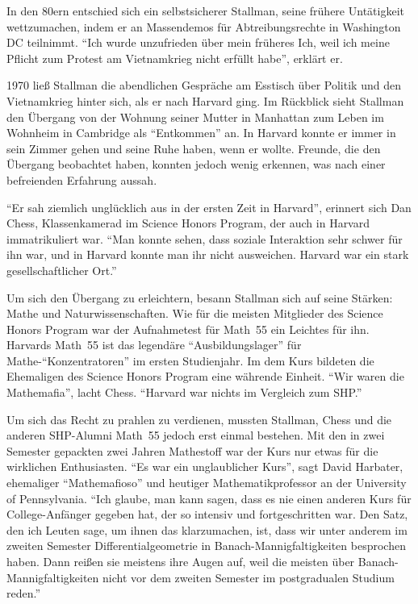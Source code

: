 In den 80ern entschied sich ein selbstsicherer Stallman, seine frühere Untätigkeit wettzumachen, indem er an Massendemos für Abtreibungsrechte in Washington DC teilnimmt. "`Ich wurde unzufrieden über mein früheres Ich, weil ich meine Pflicht zum Protest am Vietnamkrieg nicht erfüllt habe"', erklärt er.

1970 ließ Stallman die abendlichen Gespräche am Esstisch über Politik und den Vietnamkrieg hinter sich, als er nach Harvard ging. Im Rückblick sieht Stallman den Übergang von der Wohnung seiner Mutter in Manhattan zum Leben im Wohnheim in Cambridge als "`Entkommen"' an. In Harvard konnte er immer in sein Zimmer gehen und seine Ruhe haben, wenn er wollte. Freunde, die den Übergang beobachtet haben, konnten jedoch wenig erkennen, was nach einer befreienden Erfahrung aussah.

"`Er sah ziemlich unglücklich aus in der ersten Zeit in Harvard"', erinnert sich Dan Chess, Klassenkamerad im Science Honors Program, der auch in Harvard immatrikuliert war. "`Man konnte sehen, dass soziale Interaktion sehr schwer für ihn war, und in Harvard konnte man ihr nicht ausweichen. Harvard war ein stark gesellschaftlicher Ort."'

Um sich den Übergang zu erleichtern, besann Stallman sich auf seine Stärken: Mathe und Naturwissenschaften. Wie für die meisten Mitglieder des Science Honors Program war der Aufnahmetest für Math~55 ein Leichtes für ihn. Harvards Math~55 ist das legendäre "`Ausbildungslager"' für Mathe-"`Konzentratoren"' im ersten Studienjahr. Im dem Kurs bildeten die Ehemaligen des Science Honors Program eine währende Einheit. "`Wir waren die Mathemafia"', lacht Chess. "`Harvard war nichts im Vergleich zum SHP."'

Um sich das Recht zu prahlen zu verdienen, mussten Stallman, Chess und die anderen SHP-Alumni Math~55 jedoch erst einmal bestehen. Mit den in zwei Semester gepackten zwei Jahren Mathestoff war der Kurs nur etwas für die wirklichen Enthusiasten. "`Es war ein unglaublicher Kurs"', sagt David Harbater, ehemaliger "`Mathemafioso"' und heutiger Mathematikprofessor an der University of Pennsylvania. "`Ich glaube, man kann sagen, dass es nie einen anderen Kurs für College-Anfänger gegeben hat, der so intensiv und fortgeschritten war. Den Satz, den ich Leuten sage, um ihnen das klarzumachen, ist, dass wir unter anderem im zweiten Semester Differentialgeometrie in Banach-Mannigfaltigkeiten besprochen haben. Dann reißen sie meistens ihre Augen auf, weil die meisten über Banach-Mannigfaltigkeiten nicht vor dem zweiten Semester im postgradualen Studium reden."'


